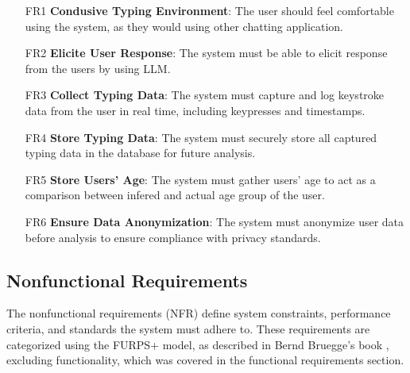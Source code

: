 \begin{itemize} 
    \item [FR1] \textbf{Condusive Typing Environment}: The user should feel comfortable using the system, as they would using other chatting application.
    \item [FR2] \textbf{Elicite User Response}: The system must be able to elicit response from the users by using \ac{LLM}. 
    \item [FR3] \textbf{Collect Typing Data}: The system must capture and log keystroke data from the user in real time, including keypresses and timestamps. 
    \item [FR4] \textbf{Store Typing Data}: The system must securely store all captured typing data in the database for future analysis. 
    \item [FR5] \textbf{Store Users' Age}: The system must gather users' age to act as a comparison between infered and actual age group of the user. 
    \item [FR6] \textbf{Ensure Data Anonymization}: The system must anonymize user data before analysis to ensure compliance with privacy standards. 
\end{itemize}

\subsection{Nonfunctional Requirements}



The nonfunctional requirements (NFR) define system constraints, performance criteria, and standards the system must adhere to. 
These requirements are categorized using the FURPS+ model, as described in Bernd Bruegge's book \cite{bruegge2004object}, excluding functionality, which was covered in the functional requirements section.

